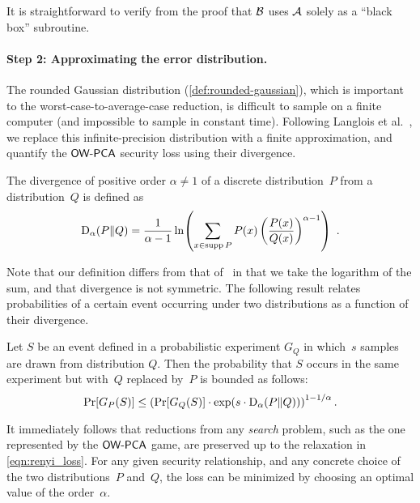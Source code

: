 \documentclass{iacrcc}
\begin{document}
\noindent It is straightforward to verify from the proof that
$\mathcal{B}$ uses $\mathcal{A}$ solely as a ``black box'' subroutine.

\paragraph{Step 2: Approximating the error distribution.}

The rounded Gaussian distribution (\autoref{def:rounded-gaussian}),
which is important to the worst-case-to-average-case reduction, is
difficult to sample on a finite computer (and impossible to sample in
constant time). Following Langlois et al.~\cite{EC:LanSteSte14}, we
replace this infinite-precision distribution with a finite
approximation, and quantify the $\textsf{\upshape\mdseries OW-PCA}$ security loss using their
\renyi divergence.

\begin{definition}
  \label{def:renyi}
  The \renyi divergence of positive order $\alpha \neq 1$ of a
  discrete distribution~$P$ from a distribution~$Q$ is defined as
  \[
    \RD_\alpha(P\|Q)=\frac1{\alpha-1}\ln \parens*{
    \sum_{x\in\mathop{\mathrm{supp}} P} P(x)\left(
      \frac{P(x)}{Q(x)}\right)^{\alpha-1}} \enspace .
  \]
\end{definition}

Note that our definition differs from that of~\cite{EC:LanSteSte14} in
that we take the logarithm of the sum, and that \renyi divergence is
not symmetric.  The following result relates probabilities of a
certain event occurring under two distributions as a function of their
\renyi divergence.

\begin{lemma}
  \label{lem:renyi}
  Let $S$ be an event defined in a probabilistic experiment $G_Q$ in
  which~$s$ samples are drawn from distribution $Q$. Then the
  probability that $S$ occurs in the same experiment but with~$Q$
  replaced by~$P$ is bounded as follows:
  \begin{equation}
    \label{eqn:renyi_loss}
    \Pr[G_P(S)] \leq \left( \Pr[G_Q(S)] \cdot \exp(s \cdot
      \mathrm{D}_\alpha(P\|Q)) \right)^{1-1/\alpha}.
  \end{equation}
\end{lemma}

It immediately follows that reductions from any \emph{search} problem,
such as the one represented by the $\textsf{\upshape\mdseries OW-PCA}$ game, are preserved up to
the relaxation in \eqref{eqn:renyi_loss}. For any given security
relationship, and any concrete choice of the two distributions~$P$
and~$Q$, the loss can be minimized by choosing an optimal value of the
order~$\alpha$.
\end{document}

